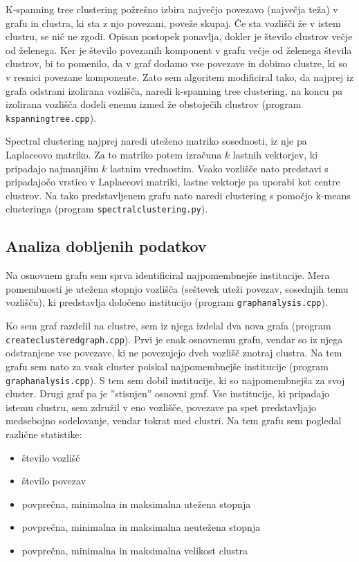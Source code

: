 \documentclass[a4paper,12pt]{article}
\begin{document}
	K-spanning tree clustering požrešno izbira največjo povezavo (največja teža) v grafu in clustra, ki sta z njo povezani, poveže skupaj. Če sta vozlišči že v istem clustru, se nič ne zgodi. Opisan postopek ponavlja, dokler je število clustrov večje od želenega. Ker je število povezanih komponent v grafu večje od želenega števila clustrov, bi to pomenilo, da v graf dodamo vse povezave in dobimo clustre, ki so v resnici povezane komponente. Zato sem algoritem modificiral tako, da najprej iz grafa odstrani izolirana vozlišča, naredi k-spanning tree clustering, na koncu pa izolirana vozlišča dodeli enemu izmed že obstoječih clustrov (program \texttt{k\textunderscore spanning\textunderscore tree.cpp}).
	
	Spectral clustering najprej naredi uteženo matriko sosednosti, iz nje pa Laplaceovo matriko. Za to matriko potem izračuna $k$ lastnih vektorjev, ki pripadajo najmanjšim $k$ lastnim vrednostim. Vsako vozlišče nato predstavi s pripadajočo vrstico v Laplaceovi matriki, lastne vektorje pa uporabi kot centre clustrov. Na tako predstavljenem grafu nato naredi clustering s pomočjo k-means clusteringa (program \texttt{spectral\textunderscore clustering.py}).
	
	\subsection{Analiza dobljenih podatkov}
	Na osnovnem grafu sem sprva identificiral najpomembnejše institucije. Mera pomembnosti je utežena stopnjo vozlišča (seštevek uteži povezav, sosednjih temu vozlišču), ki predstavlja določeno institucijo (program \texttt{graph\textunderscore analysis.cpp}).
	
	Ko sem graf razdelil na clustre, sem iz njega izdelal dva nova grafa (program \texttt{create\textunderscore clustered\textunderscore graph.cpp}). Prvi je enak osnovnemu grafu, vendar so iz njega odstranjene vse povezave, ki ne povezujejo dveh vozlišč znotraj clustra. Na tem grafu sem nato za vsak cluster poiskal najpomembnejše institucije (program \texttt{graph\textunderscore analysis.cpp}). S tem sem dobil institucije, ki so najpomembnejša za svoj cluster. Drugi graf pa je ''stisnjen'' osnovni graf. Vse institucije, ki pripadajo istemu clustru, sem združil v eno vozlišče, povezave pa spet predstavljajo medsebojno sodelovanje, vendar tokrat med clustri. Na tem grafu sem pogledal različne statistike:
	\begin{itemize}
		\item število vozlišč
		\item število povezav
		\item povprečna, minimalna in maksimalna utežena stopnja
		\item povprečna, minimalna in maksimalna neutežena stopnja
		\item povprečna, minimalna in maksimalna velikost clustra
	\end{itemize}
	
\end{document}
